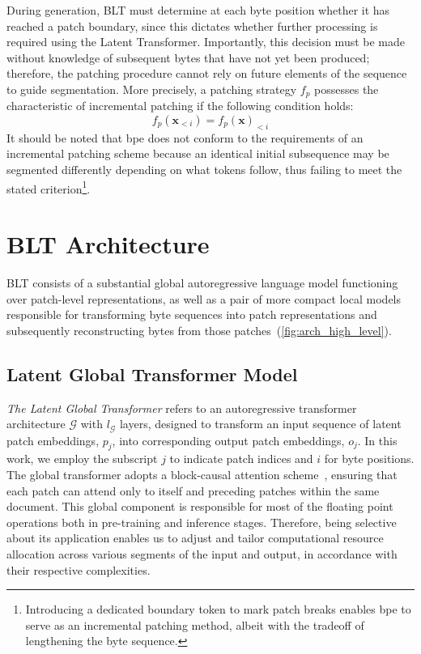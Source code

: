 During generation, {\textsc BLT} must determine at each byte position whether it has reached a patch boundary, since this dictates whether further processing is required using the Latent Transformer. Importantly, this decision must be made without knowledge of subsequent bytes that have not yet been produced; therefore, the patching procedure cannot rely on future elements of the sequence to guide segmentation. More precisely, a patching strategy $f_p$ possesses the characteristic of incremental patching if the following condition holds:
$$f_p(\pmb{x}_{<i}) = f_p(\pmb{x})_{<i}$$
It should be noted that bpe does not conform to the requirements of an incremental patching scheme because an identical initial subsequence may be segmented differently depending on what tokens follow, thus failing to meet the stated criterion\footnote{Introducing a dedicated boundary token to mark patch breaks enables bpe to serve as an incremental patching method, albeit with the tradeoff of lengthening the byte sequence.}.

\section{{\textsc BLT} Architecture}
\label{section:architecture}
{\textsc BLT} consists of a substantial global autoregressive language model functioning over patch-level representations, as well as a pair of more compact local models responsible for transforming byte sequences into patch representations and subsequently reconstructing bytes from those patches~(\autoref{fig:arch_high_level}).

\subsection{Latent Global Transformer Model}

\textit{The Latent Global Transformer} refers to an autoregressive transformer architecture $\mathcal{G}$ with $l_{\mathcal{G}}$ layers, designed to transform an input sequence of latent patch embeddings, $p_j$, into corresponding output patch embeddings, $o_j$. In this work, we employ the subscript $j$ to indicate patch indices and $i$ for byte positions. The global transformer adopts a block-causal attention scheme~\citep{dubey2024llama}, ensuring that each patch can attend only to itself and preceding patches within the same document. This global component is responsible for most of the floating point operations both in pre-training and inference stages. Therefore, being selective about its application enables us to adjust and tailor computational resource allocation across various segments of the input and output, in accordance with their respective complexities.


